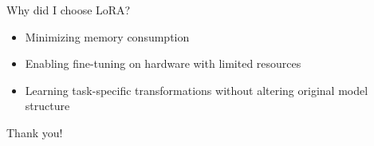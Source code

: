 \documentclass[aspectratio=169]{beamer}
\begin{document}
\note{ }

\begin{frame}{Why did I choose LoRA?}

  \begin{itemize}
    \setlength\itemsep{1em}
    \item Minimizing memory consumption
    \item Enabling fine-tuning on hardware with limited resources
    \item Learning task-specific transformations without altering original model structure
  \end{itemize}

\end{frame}

\note{ }

{
  \begin{frame}[plain,c]
    \begin{center}
      \Huge \color[rgb]{1,1,1}Thank you!
    \end{center}
  \end{frame}
}
\end{document}
